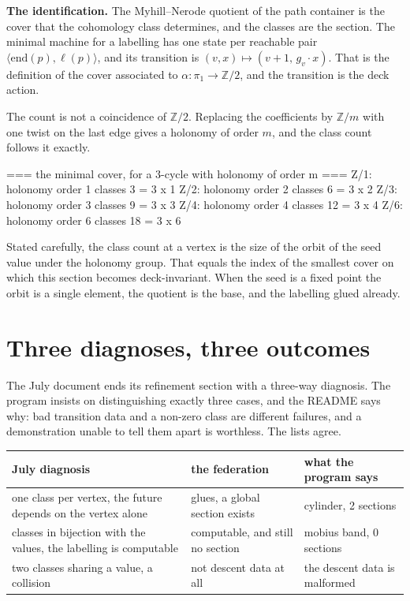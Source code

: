\documentclass[11pt,a4paper]{article}
\begin{document}
\begin{sectionbox}
\textbf{The identification.} The Myhill--Nerode quotient of the path container
is the cover that the cohomology class determines, and the classes are the
section. The minimal machine for a labelling has one state per reachable pair
$\langle \mathrm{end}(p), \ell(p) \rangle$, and its transition is
$(v,x) \mapsto (v+1,\, g_v \cdot x)$. That is the definition of the cover
associated to $\alpha : \pi_1 \to \mathbb{Z}/2$, and the transition is the
deck action.
\end{sectionbox}

The count is not a coincidence of $\mathbb{Z}/2$. Replacing the coefficients by
$\mathbb{Z}/m$ with one twist on the last edge gives a holonomy of order $m$,
and the class count follows it exactly.

\begin{term}
=== the minimal cover, for a 3-cycle with holonomy of order m ===
  Z/1: holonomy order  1   classes   3   = 3 x 1
  Z/2: holonomy order  2   classes   6   = 3 x 2
  Z/3: holonomy order  3   classes   9   = 3 x 3
  Z/4: holonomy order  4   classes  12   = 3 x 4
  Z/6: holonomy order  6   classes  18   = 3 x 6
\end{term}

Stated carefully, the class count at a vertex is the size of the orbit of the
seed value under the holonomy group. That equals the index of the smallest cover
on which this section becomes deck-invariant. When the seed is a fixed point the
orbit is a single element, the quotient is the base, and the labelling glued
already.

\section{Three diagnoses, three outcomes}

The July document ends its refinement section with a three-way diagnosis. The
program insists on distinguishing exactly three cases, and the README says why:
bad transition data and a non-zero class are different failures, and a
demonstration unable to tell them apart is worthless. The lists agree.

\begin{center}
\begin{tabular}{@{}>{\raggedright\arraybackslash}p{5.6cm}>{\raggedright\arraybackslash}p{4.1cm}>{\raggedright\arraybackslash}p{3.9cm}@{}}
\toprule
\textbf{July diagnosis} & \textbf{the federation} & \textbf{what the program says} \\
\midrule
one class per vertex, the future depends on the vertex alone
  & glues, a global section exists
  & cylinder, 2 sections \\
classes in bijection with the values, the labelling is computable
  & computable, and still no section
  & mobius band, 0 sections \\
two classes sharing a value, a collision
  & not descent data at all
  & the descent data is malformed \\
\bottomrule
\end{tabular}
\end{center}
\end{document}
